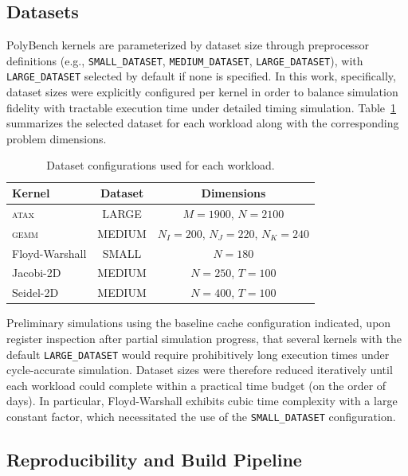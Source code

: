 \documentclass[conference]{IEEEtran}
\begin{document}
\subsection{Datasets}\label{sub:dataset-size}

PolyBench kernels are parameterized by dataset size through preprocessor
definitions (e.g., \texttt{SMALL\_DATASET}, \texttt{MEDIUM\_DATASET},
\texttt{LARGE\_DATASET}), with \texttt{LARGE\_DATASET} selected by default if
none is specified. In this work, specifically, dataset sizes were explicitly
configured per kernel in order to balance simulation fidelity with tractable
execution time under detailed timing simulation. Table~\ref{tab:datasets}
summarizes the selected dataset for each workload along with the corresponding
problem dimensions.

\begin{table}[htbp]
	\centering
	\caption{Dataset configurations used for each workload.}
	\begin{tabular}{|l|c|c|}
		\hline
		\textbf{Kernel} & \textbf{Dataset} & \textbf{Dimensions} \\
		\hline
		\hline
		\textsc{ata}x   & LARGE            & $M = 1900$, $N = 2100$ \\
		\textsc{gemm}   & MEDIUM           & $N_I = 200$, $N_J = 220$, $N_K = 240$ \\
		Floyd-Warshall  & SMALL            & $N = 180$ \\
		Jacobi-2D       & MEDIUM           & $N = 250$, $T = 100$ \\
		Seidel-2D       & MEDIUM           & $N = 400$, $T = 100$ \\
		\hline
	\end{tabular}
	\label{tab:datasets}
\end{table}

Preliminary simulations using the baseline cache configuration indicated, upon
register inspection after partial simulation progress, that several kernels
with the default \texttt{LARGE\_DATASET} would require prohibitively long
execution times under cycle-accurate simulation. Dataset sizes were therefore
reduced iteratively until each workload could complete within a practical time
budget (on the order of days). In particular, Floyd-Warshall exhibits cubic
time complexity with a large constant factor, which necessitated the use of the
\texttt{SMALL\_DATASET} configuration.

\subsection{Reproducibility and Build Pipeline}
\end{document}
